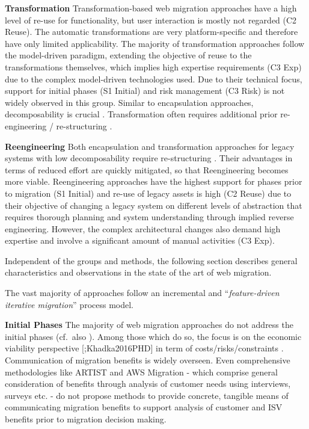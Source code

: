 \textbf{Transformation} Transformation-based web migration approaches have a high level of re-use for functionality, but user interaction is mostly not regarded (C2 Reuse).
The automatic transformations are very platform-specific and therefore have only limited applicability.
The majority of transformation approaches follow the model-driven paradigm, extending the objective of reuse to the transformations themselves, which implies high expertise requirements (C3 Exp) due to the complex model-driven technologies used.
Due to their technical focus, support for initial phases (S1 Initial) and risk management (C3 Risk) is not widely observed in this group.
Similar to encapsulation approaches, decomposability is crucial \autocite{Khadka2016PHD,Khadka2013SurveySOAMigration,Lucia2008,Lucia2006}.
Transformation often requires additional prior re-engineering / re-structuring \autocite{Nasr2010}.

\textbf{Reengineering} Both encapsulation and transformation approaches for legacy systems with low decomposability require re-structuring \autocite{Nasr2010,Aversano2001,Wagner2014Fundamentals,Khadka2016PHD,Khadka2013SurveySOAMigration,Lucia2008,Lucia2006}.
Their advantages in terms of reduced effort are quickly mitigated, so that Reengineering becomes more viable.
Reengineering approaches have the highest support for phases prior to migration (S1 Initial) and re-use of legacy assets is high (C2 Reuse) due to their objective of changing a legacy system on different levels of abstraction that requires thorough planning and system understanding through implied reverse engineering.
However, the complex architectural changes also demand high expertise and involve a significant amount of manual activities (C3 Exp).

Independent of the groups and methods, the following section describes general characteristics and observations in the state of the art of web migration.

The vast majority of approaches follow an incremental and ``\emph{feature-driven iterative migration}'' \autocite{Menychtas2014ARTISTJournal} process model.

\textbf{Initial Phases} The majority of web migration approaches do not address the initial phases (cf.~also \autocite{Heil2017Survey}).
Among those which do so, the focus is on the economic viability perspective {[}\textcite{Khadka2011ServiciFi};Khadka2016PHD{]} in term of costs/risks/constraints \autocite{Razavian2012}.
Communication of migration benefits is widely overseen.
Even comprehensive methodologies like ARTIST and AWS Migration - which comprise general consideration of benefits through analysis of customer needs using interviews, surveys etc.
- do not propose methods to provide concrete, tangible means of communicating migration benefits to support analysis of customer and ISV benefits prior to migration decision making.

